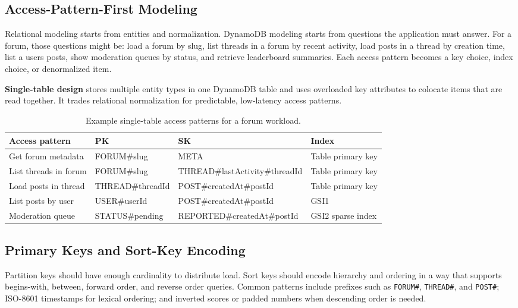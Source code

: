 \subsection{Access-Pattern-First Modeling}
Relational modeling starts from entities and normalization. DynamoDB modeling starts from questions the application must answer. For a forum, those questions might be: load a forum by slug, list threads in a forum by recent activity, load posts in a thread by creation time, list a user\textquotesingle{}s posts, show moderation queues by status, and retrieve leaderboard summaries. Each access pattern becomes a key choice, index choice, or denormalized item.

\begin{definitionbox}
\textbf{Single-table design} stores multiple entity types in one DynamoDB table and uses overloaded key attributes to colocate items that are read together. It trades relational normalization for predictable, low-latency access patterns.
\end{definitionbox}

\begin{table}[H]
\centering
\small
\begin{tabular}{@{}p{3.3cm}p{3.3cm}p{3.2cm}p{3.2cm}@{}}
\toprule
\textbf{Access pattern} & \textbf{PK} & \textbf{SK} & \textbf{Index} \\
\midrule
Get forum metadata & FORUM\#slug & META & Table primary key \\
List threads in forum & FORUM\#slug & THREAD\#lastActivity\#threadId & Table primary key \\
Load posts in thread & THREAD\#threadId & POST\#createdAt\#postId & Table primary key \\
List posts by user & USER\#userId & POST\#createdAt\#postId & GSI1 \\
Moderation queue & STATUS\#pending & REPORTED\#createdAt\#postId & GSI2 sparse index \\
\bottomrule
\end{tabular}
\caption{Example single-table access patterns for a forum workload.}
\label{tab:forum-access-patterns}
\end{table}

\subsection{Primary Keys and Sort-Key Encoding}
Partition keys should have enough cardinality to distribute load. Sort keys should encode hierarchy and ordering in a way that supports begins-with, between, forward order, and reverse order queries. Common patterns include prefixes such as \texttt{FORUM\#}, \texttt{THREAD\#}, and \texttt{POST\#}; ISO-8601 timestamps for lexical ordering; and inverted scores or padded numbers when descending order is needed.

